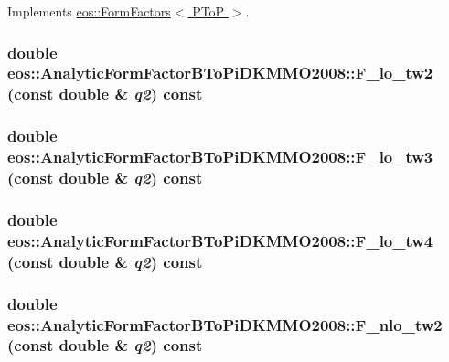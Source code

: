 Implements \hyperlink{classeos_1_1FormFactors_3_01PToP_01_4_a097a12cde6acb9004d1a92cbb8e60734}{eos::FormFactors$<$ PToP $>$}.\hypertarget{classeos_1_1AnalyticFormFactorBToPiDKMMO2008_a8eff8336c192970590daafaad2e1ae0d}{
\subsubsection[{F\_\-lo\_\-tw2}]{\setlength{\rightskip}{0pt plus 5cm}double eos::AnalyticFormFactorBToPiDKMMO2008::F\_\-lo\_\-tw2 (const double \& {\em q2}) const}}
\label{classeos_1_1AnalyticFormFactorBToPiDKMMO2008_a8eff8336c192970590daafaad2e1ae0d}
\hypertarget{classeos_1_1AnalyticFormFactorBToPiDKMMO2008_ae19b96e05460dcb94c6382a49bc009a4}{
\subsubsection[{F\_\-lo\_\-tw3}]{\setlength{\rightskip}{0pt plus 5cm}double eos::AnalyticFormFactorBToPiDKMMO2008::F\_\-lo\_\-tw3 (const double \& {\em q2}) const}}
\label{classeos_1_1AnalyticFormFactorBToPiDKMMO2008_ae19b96e05460dcb94c6382a49bc009a4}
\hypertarget{classeos_1_1AnalyticFormFactorBToPiDKMMO2008_a1a9ca014971d5c140df4fc3c9bf03879}{
\subsubsection[{F\_\-lo\_\-tw4}]{\setlength{\rightskip}{0pt plus 5cm}double eos::AnalyticFormFactorBToPiDKMMO2008::F\_\-lo\_\-tw4 (const double \& {\em q2}) const}}
\label{classeos_1_1AnalyticFormFactorBToPiDKMMO2008_a1a9ca014971d5c140df4fc3c9bf03879}
\hypertarget{classeos_1_1AnalyticFormFactorBToPiDKMMO2008_abb2691fe8415e5c5c4db53af3ef4ba41}{
\subsubsection[{F\_\-nlo\_\-tw2}]{\setlength{\rightskip}{0pt plus 5cm}double eos::AnalyticFormFactorBToPiDKMMO2008::F\_\-nlo\_\-tw2 (const double \& {\em q2}) const}}
